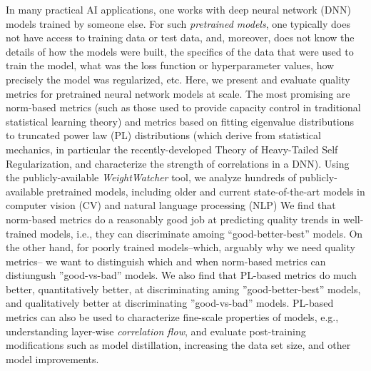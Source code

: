 
In many practical AI applications, one works with deep neural network (DNN) models trained by someone else.
For such \emph{pretrained models}, one typically does not have access to training data or test data, and, moreover,  does not know the details of how the models were built, the specifics of the data that were used to train the model, what was the loss function or hyperparameter values, how precisely the model was regularized, etc.
Here, we present and evaluate quality metrics for pretrained neural network models at scale.
The most promising are norm-based metrics (such as those used to provide capacity control in traditional statistical learning theory) and metrics based on fitting eigenvalue distributions to truncated power law (PL) distributions (which derive from statistical mechanics, in particular the recently-developed Theory of Heavy-Tailed Self Regularization, and characterize the strength of correlations in a DNN). 
%
Using the publicly-available \emph{WeightWatcher} tool, we analyze hundreds of publicly-available pretrained models, including older and current state-of-the-art models in computer vision (CV) and natural language processing (NLP)
We find that norm-based metrics do a reasonably good job at predicting quality trends in well-trained models, i.e., they can discriminate amoing ``good-better-best''  models.
On the other hand, for poorly trained models--which, arguably why we need quality metrics-- we want to distinguish which and when norm-based metrics can distiungush ''good-vs-bad'' models.
We also find that PL-based metrics do much better, quantitatively better, at discriminating aming ''good-better-best'' models, and qualitatively better at discriminating ''good-vs-bad'' models.
PL-based metrics can also be used to characterize fine-scale properties of models, e.g., understanding layer-wise \emph{correlation flow}, and evaluate post-training modifications such as model distillation, increasing the data set size, and other model improvements.

